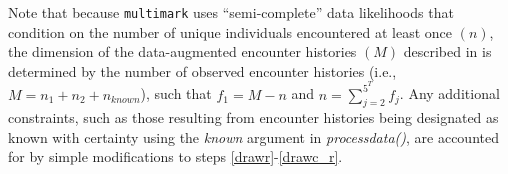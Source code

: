 \documentclass[12pt]{article}
\begin{document}
Note that because \verb|multimark| uses ``semi-complete'' data likelihoods that condition on the number of unique individuals encountered at least once $(n)$, the dimension of the data-augmented encounter histories $(M)$ described in \cite{McClintockEtAl2014} is determined by the number of observed encounter histories (i.e., $M=n_1+n_2+n_{known}$), such that $f_1=M-n$ and $n=\sum_{j=2}^{5^T} f_j$. Any additional constraints, such as those resulting from encounter histories being designated as known with certainty using the \textit{known} argument in \textit{processdata()}, are accounted for by simple modifications to steps \ref{drawr}-\ref{drawc_r}.



\end{document}
